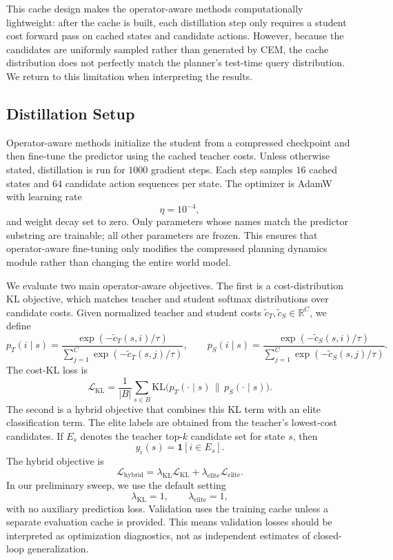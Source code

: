 \documentclass[11pt]{article}
\begin{document}
This cache design makes the operator-aware methods computationally lightweight: after the cache is built, each distillation step only requires a student cost forward pass on cached states and candidate actions. However, because the candidates are uniformly sampled rather than generated by CEM, the cache distribution does not perfectly match the planner's test-time query distribution. We return to this limitation when interpreting the results.

\subsection{Distillation Setup}
\label{sec:distillation_setup}

Operator-aware methods initialize the student from a compressed checkpoint and then fine-tune the predictor using the cached teacher costs. Unless otherwise stated, distillation is run for \(1000\) gradient steps. Each step samples \(16\) cached states and \(64\) candidate action sequences per state. The optimizer is AdamW with learning rate
\[
    \eta = 10^{-4},
\]
and weight decay set to zero. Only parameters whose names match the predictor substring are trainable; all other parameters are frozen. This ensures that operator-aware fine-tuning only modifies the compressed planning dynamics module rather than changing the entire world model.

We evaluate two main operator-aware objectives. The first is a cost-distribution KL objective, which matches teacher and student softmax distributions over candidate costs. Given normalized teacher and student costs \(\tilde c_T,\tilde c_S \in \mathbb{R}^C\), we define
\[
    p_T(i \mid s)
    =
    \frac{\exp(-\tilde c_T(s,i)/\tau)}
         {\sum_{j=1}^{C}\exp(-\tilde c_T(s,j)/\tau)},
    \qquad
    p_S(i \mid s)
    =
    \frac{\exp(-\tilde c_S(s,i)/\tau)}
         {\sum_{j=1}^{C}\exp(-\tilde c_S(s,j)/\tau)}.
\]
The cost-KL loss is
\[
    \mathcal{L}_{\mathrm{KL}}
    =
    \frac{1}{|B|}
    \sum_{s \in B}
    \mathrm{KL}
    \bigl(
        p_T(\cdot \mid s)
        \,\|\, 
        p_S(\cdot \mid s)
    \bigr).
\]
The second is a hybrid objective that combines this KL term with an elite classification term. The elite labels are obtained from the teacher's lowest-cost candidates. If \(E_s\) denotes the teacher top-\(k\) candidate set for state \(s\), then
\[
    y_i(s) = \mathbf{1}[i \in E_s].
\]
The hybrid objective is
\[
    \mathcal{L}_{\mathrm{hybrid}}
    =
    \lambda_{\mathrm{KL}}\mathcal{L}_{\mathrm{KL}}
    +
    \lambda_{\mathrm{elite}}\mathcal{L}_{\mathrm{elite}}.
\]
In our preliminary sweep, we use the default setting
\[
    \lambda_{\mathrm{KL}} = 1,
    \qquad
    \lambda_{\mathrm{elite}} = 1,
\]
with no auxiliary prediction loss. Validation uses the training cache unless a separate evaluation cache is provided. This means validation losses should be interpreted as optimization diagnostics, not as independent estimates of closed-loop generalization.
\end{document}
